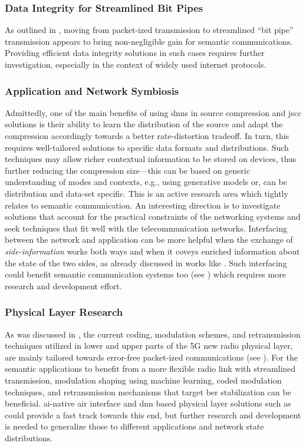 \subsubsection{Data Integrity for Streamlined Bit Pipes}
As outlined in , moving from  packet-ized transmission to streamlined ``bit pipe'' transmission appears to bring non-negligible gain for semantic communications. Providing efficient data integrity solutions in such cases requires further investigation, especially in the context of widely used internet protocols.

\subsubsection{Application and Network Symbiosis}
Admittedly, one of the main benefits of using \glspl{dnn} in source compression and \gls{jscc} solutions is their ability  to learn the distribution of the source and adapt the compression accordingly towards a better rate-distortion tradeoff. In turn, this requires well-tailored solutions to specific data formats and distributions. Such techniques may allow richer contextual information to be stored on devices, thus further reducing the compression size---this can be based on generic understanding of modes and contexts, e.g., using generative models or, can be distribution and data-set specific. This is an active research area which tightly relates to semantic communication. An interesting direction is to investigate solutions that account for the practical constraints of the networking systems and seek techniques that fit well with the telecommunication networks. Interfacing between the network and application can be more helpful when the exchange of \emph{side-information} works both ways and when it coveys enriched information about the state of the two sides, as already discussed in works like \cite{10201232}. Such interfacing could benefit semantic communication systems too (see ) which requires more research and development effort.   

\subsubsection{Physical Layer Research}

As was discussed in , the current coding, modulation schemes, and retransmission techniques utilized in lower and upper parts of the 5G new radio physical layer, are mainly tailored  towards error-free packet-ized communications (see ). For the semantic applications to benefit from a more flexible radio link with streamlined transmission, modulation shaping using machine learning, coded modulation techniques, and retransmission mechanisms that target \gls{ber}  stabilization  can be beneficial. \Gls{ai}-native air interface and \gls{dnn} based physical layer solutions such as \cite{honkala2021deeprx} could provide a fast track towards this end, but further research and development is needed  to generalize those to different applications and network state distributions. 

